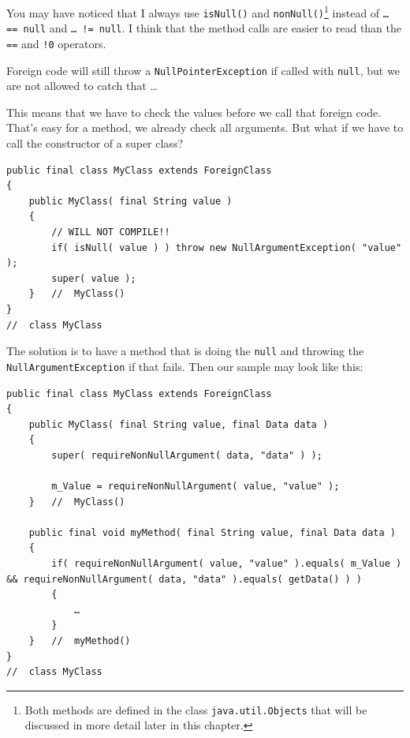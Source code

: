 \documentclass[11pt,a4paper, titlepage, parskip=half, headsepline, footsepline, cleardoublepage=current, headheight=1cm]{scrbook}
\begin{document}
You may have noticed that I always use \lstinline|isNull()|\autocite{ORACLE_DOC_OBJECTS:isNull} and \lstinline|nonNull()|\autocite{ORACLE_DOC_OBJECTS:nonNull}\footnote{Both methods are defined in the class \lstinline|java.util.Objects|\autocite{ORACLE_DOC_OBJECTS_CLASS} that will be discussed in more detail later in this chapter.} instead of \lstinline|… == null| and \lstinline|… != null|. I think that the method calls are easier to read than the \verb#==# and \verb#!0# operators.

Foreign code will still throw a \lstinline|NullPointerException| if called with \lstinline|null|, but we are not allowed to catch that …

This means that we have to check the values before we call that foreign code. That's easy for a method, we already check all arguments. But what if we have to call the constructor of a super class?
\begin{lstlisting}
public final class MyClass extends ForeignClass
{
    public MyClass( final String value )
    {
        // WILL NOT COMPILE!!
        if( isNull( value ) ) throw new NullArgumentException( "value" );
        super( value );
    }   //  MyClass()
}
//  class MyClass
\end{lstlisting}

The solution is to have a method that is doing the \lstinline|null| and throwing the \lstinline|NullArgumentException| if that fails. Then our sample may look like this:

\begin{lstlisting}
public final class MyClass extends ForeignClass
{
    public MyClass( final String value, final Data data )
    {
        super( requireNonNullArgument( data, "data" ) );
        
        m_Value = requireNonNullArgument( value, "value" );
    }   //  MyClass()
    
    public final void myMethod( final String value, final Data data )
    {
        if( requireNonNullArgument( value, "value" ).equals( m_Value ) && requireNonNullArgument( data, "data" ).equals( getData() ) )
        {
            …
        }
    }   //  myMethod()
}
//  class MyClass
\end{lstlisting}
\end{document}
